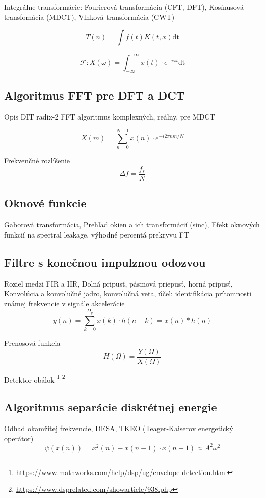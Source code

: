 Integrálne transformácie: Fourierová transformácia (CFT, DFT), Kosínusová transfomácia (MDCT), Vlnková transformácia (CWT) \cite{dct} \cite{casove-frekvencia-analyza-signalu}

\begin{equation}
T(n) = \int{f(t) K(t,x) \mathrm{dt}}
\end{equation}

\begin{equation}
\mathcal{F}: X(\omega) = \int_{-\infty}^{+\infty}{x(t) \cdot e^{-i\omega t} \mathrm{dt}}
\end{equation}

\subsection{Algoritmus FFT pre DFT a DCT}
Opis DIT radix-2 FFT algoritmus komplexných, reálny, pre MDCT \cite{fft-blackbox}

\begin{equation}
X(m) = \sum_{n = 0}^{N-1}{x(n) \cdot e^{-i2\pi n m / N}}
\end{equation}

Frekvenčné rozlíšenie
\begin{equation}
\Delta f = \frac{f_s}{N}
\end{equation}

\subsection{Oknové funkcie}
Gaborová transformácia, Prehľad okien a ich transformácií (sinc), Efekt oknových funkcií na spectral leakage, výhodné percentá prekryvu FT 	\cite{understanding-dsp} \cite{spectral-density-estimation}

\subsection{Filtre s konečnou impulznou odozvou}
Roziel medzi FIR a IIR, Dolná pripusť, pásmová priepusť, horná pripusť,
 Konvolúcia a konvolučné jadro, konvolučná veta, účel: identifikácia prítomnosti známej frekvencie v signále akcelerácie
\begin{equation}
y(n) = \sum_{k=0}^{D_y}{x(k) \cdot h(n-k)} = x(n) * h(n)
\end{equation}

Prenosová funkcia
\begin{equation}
H(\Omega) = \frac{Y(\Omega)}{X(\Omega)}
\end{equation}	

Detektor obálok	\footnote{\url{https://www.mathworks.com/help/dsp/ug/envelope-detection.html}} \footnote{\url{https://www.dsprelated.com/showarticle/938.php}}

\subsection{Algoritmus separácie diskrétnej energie}
Odhad okamžitej frekvencie, DESA, TKEO (Teager-Kaiserov energetický operátor) \cite{eeg-spanok} 
\begin{equation}
\psi(x(n)) = x^2(n) - x(n-1) \cdot x(n+1) \approx A^2\omega^2
\end{equation}
	
\emptypage 
